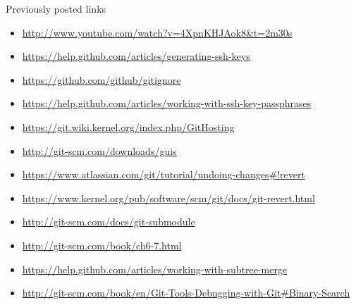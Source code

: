 \documentclass[10pt,a4paper]{beamer}
\begin{document}
\begin{frame}{Previously posted links}
\begin{itemize}
\item \href{http://www.youtube.com/watch?v=4XpnKHJAok8\&t=2m30s}{\color{blue}http://www.youtube.com/watch?v=4XpnKHJAok8\&t=2m30s}
\item \href{https://help.github.com/articles/generating-ssh-keys}{\color{blue}https://help.github.com/articles/generating-ssh-keys}
\item \href{https://github.com/github/gitignore}{\color{blue}https://github.com/github/gitignore}
\item \href{https://help.github.com/articles/working-with-ssh-key-passphrases}{\color{blue}https://help.github.com/articles/working-with-ssh-key-passphrases}
\item \href{https://git.wiki.kernel.org/index.php/GitHosting}{\color{blue}https://git.wiki.kernel.org/index.php/GitHosting}
\item \href{http://git-scm.com/downloads/guis}{\color{blue}http://git-scm.com/downloads/guis} \\
\item \href{https://www.atlassian.com/git/tutorial/undoing-changes\#!revert}{\color{blue}https://www.atlassian.com/git/tutorial/undoing-changes\#!revert}
\item \href{https://www.kernel.org/pub/software/scm/git/docs/git-revert.html}{\color{blue}https://www.kernel.org/pub/software/scm/git/docs/git-revert.html}
\item \href{http://git-scm.com/docs/git-submodule}{\color{blue}http://git-scm.com/docs/git-submodule}
\item \href{http://git-scm.com/book/ch6-7.html}{\color{blue}http://git-scm.com/book/ch6-7.html}
\item \href{https://help.github.com/articles/working-with-subtree-merge}{\color{blue}https://help.github.com/articles/working-with-subtree-merge}
\item \href{http://git-scm.com/book/en/Git-Tools-Debugging-with-Git\#Binary-Search}{\color{blue}http://git-scm.com/book/en/Git-Tools-Debugging-with-Git\#Binary-Search}
\end{itemize}
\end{frame}
\end{document}
